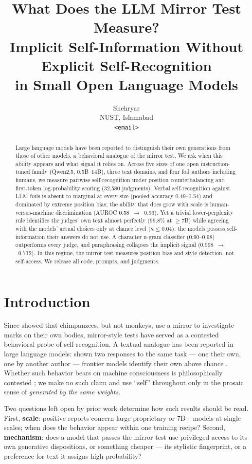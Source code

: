 \documentclass[11pt]{article}
\title{What Does the LLM Mirror Test Measure? \\
  Implicit Self-Information Without Explicit Self-Recognition \\
  in Small Open Language Models}
\author{Shehryar \\ NUST, Islamabad \\ \texttt{<email>}}
\begin{document}
\maketitle

\begin{abstract}
Large language models have been reported to distinguish their own
generations from those of other models, a behavioral analogue of the
mirror test. We ask when this ability appears and what signal it relies
on. Across five sizes of one open instruction-tuned family (Qwen2.5,
0.5B--14B), three text domains, and four foil authors including humans, we
measure pairwise self-recognition under position counterbalancing and
first-token log-probability scoring (32{,}580 judgments). Verbal
self-recognition against LLM foils is absent to marginal at every size
(pooled accuracy 0.49--0.54) and dominated by extreme position bias; the
ability that does grow with scale is human-versus-machine discrimination
(AUROC 0.58~$\rightarrow$~0.93). Yet a trivial lower-perplexity rule
identifies the judges' own text almost perfectly (99.8\% at $\geq$7B)
while agreeing with the models' actual choices only at chance level
($\kappa \leq 0.04$): the models possess self-information their answers do
not use. A character n-gram classifier (0.90--0.98) outperforms every
judge, and paraphrasing collapses the implicit signal
(0.998~$\rightarrow$~0.712). In this regime, the mirror test measures
position bias and style detection, not self-access. We release all code,
prompts, and judgments.
\end{abstract}

\section{Introduction}
Since \citet{gallup1970chimpanzees} showed that chimpanzees, but not
monkeys, use a mirror to investigate marks on their own bodies,
mirror-style tests have served as a contested behavioral probe of
self-recognition. A textual analogue has been reported in large language
models: shown two responses to the same task --- one their own, one by
another author --- frontier models identify their own above chance
\citep{panickssery2024llm}. Whether such behavior bears on machine
consciousness is philosophically contested
\citep{butlin2023consciousness,chalmers2023could}; we make no such claim
and use ``self'' throughout only in the prosaic sense of \emph{generated
by the same weights}.

Two questions left open by prior work determine how such results should be
read. First, \textbf{scale}: positive reports concern large proprietary or
7B+ models at single scales; when does the behavior appear within one
training recipe? Second, \textbf{mechanism}: does a model that passes the
mirror test use privileged access to its own generative dispositions, or
something cheaper --- its stylistic fingerprint, or a preference for text
it assigns high probability?
\end{document}
